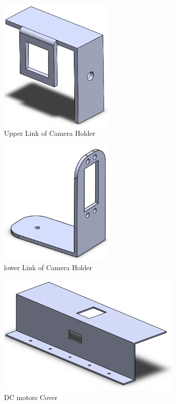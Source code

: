\documentclass[12pt]{article}
\begin{document}
\begin{figure}[H]
	\centering
	\includegraphics[width =0.5\textwidth]{Fig/solid/cam-holder-2.png}
	\caption{Upper Link of Camera Holder}
\end{figure}

\begin{figure}[H]
	\centering
	\includegraphics[width =0.5\textwidth]{Fig/solid/cam-holder-1.png}
	\caption{lower Link of Camera Holder}
\end{figure}


\begin{figure}[H]
	\centering
	\includegraphics[width =0.8\textwidth]{Fig/solid/Motor-cover.png}
	\caption{DC motors Cover}
\end{figure}
\end{document}
